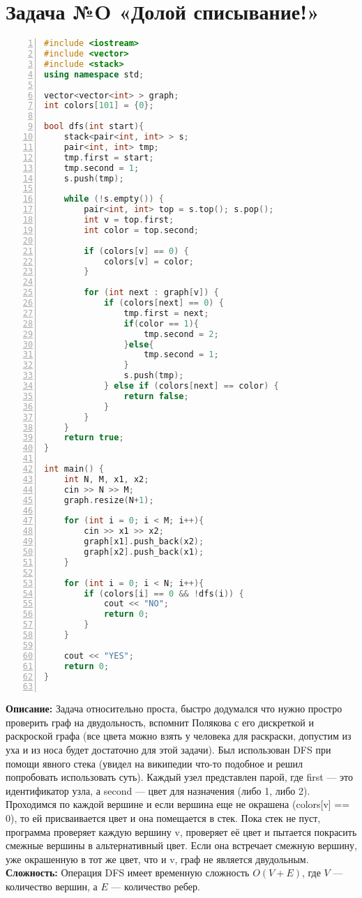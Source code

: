 \documentclass{article}
\newcommand{\descr}[2]{%
    \textbf{Описание: } #1\\
    \textbf{Сложность: } #2
}
\begin{document}
\section{Задача №O «Долой списывание!»}
\begin{lstlisting}[language=C++, frame=single, basicstyle=\ttfamily, numbers=left, numberstyle=\tiny]
#include <iostream>
#include <vector>
#include <stack>
using namespace std;

vector<vector<int> > graph;
int colors[101] = {0};

bool dfs(int start){
    stack<pair<int, int> > s;
    pair<int, int> tmp;
    tmp.first = start;
    tmp.second = 1;
    s.push(tmp);

    while (!s.empty()) {
        pair<int, int> top = s.top(); s.pop();
        int v = top.first;
        int color = top.second;

        if (colors[v] == 0) {
            colors[v] = color;
        }

        for (int next : graph[v]) {
            if (colors[next] == 0) { 
                tmp.first = next;
                if(color == 1){
                    tmp.second = 2;
                }else{
                    tmp.second = 1;
                }
                s.push(tmp);
            } else if (colors[next] == color) {
                return false;
            }
        }
    }
    return true;
}

int main() {
    int N, M, x1, x2;
    cin >> N >> M;
    graph.resize(N+1);  

    for (int i = 0; i < M; i++){
        cin >> x1 >> x2;
        graph[x1].push_back(x2);
        graph[x2].push_back(x1);
    }

    for (int i = 0; i < N; i++){
        if (colors[i] == 0 && !dfs(i)) {
            cout << "NO";
            return 0; 
        }
    }

    cout << "YES"; 
    return 0;
}
    
\end{lstlisting}
\descr{Задача относительно проста, быстро додумался что нужно простро проверить граф на двудольность, вспомнит Полякова с его дискреткой и раскроской графа (все цвета можно взять у человека для раскраски, допустим из уха и из носа будет достаточно для этой задачи). 
Был использован DFS при помощи явного стека (увидел на википедии что-то подобное и решил попробовать использовать суть). Каждый узел представлен парой, где first — это идентификатор узла, а second — цвет для назначения (либо 1, либо 2). 
Проходимся по каждой вершине и если вершина еще не окрашена (colors[v] == 0), то ей присваивается цвет и она помещается в стек.
Пока стек не пуст, программа проверяет каждую вершину v, проверяет её цвет и пытается покрасить смежные вершины в альтернативный цвет. 
Если она встречает смежную вершину, уже окрашенную в тот же цвет, что и v, граф не является двудольным.
}{Операция DFS имеет временную сложность \( O(V + E) \), где \( V \) — количество вершин, а \( E \) — количество ребер.
}
\end{document}

